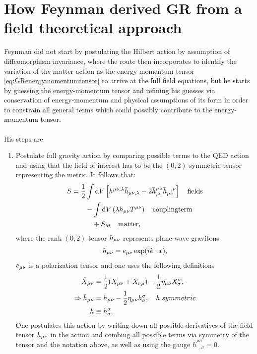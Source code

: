 \section{How Feynman derived GR from a field theoretical approach}
Feynman did not start by postulating the Hilbert action by assumption of diffeomorphism invariance, where the route then incorporates to identify the variation of the matter action as the energy momentum tensor \ref{eq:GRenergymomentumtensor} to arrive at the full field equations, but he starts by guessing the energy-momentum tensor and refining his guesses via conservation of energy-momentum and physical assumptions of its form in order to constrain all general terms which could possibly contribute to the energy-momentum tensor.\\
\\
His steps are
\begin{enumerate}
	\item Postulate full gravity action by comparing possible terms to the QED action and using that the field of interest has to be the $(0,2)$ symmetric tensor representing the metric. It follows that:
	\begin{align}
		S &= \frac{1}{2} \int \mathrm{d} V\left[h^{\mu \nu, \lambda} \bar{h}_{\mu \nu, \lambda} - 2 \bar{h}^{\mu \lambda}_{,\lambda} \bar{h}^{\;\;\,,\nu}_{\mu \nu} \right] \quad \mathrm{fields} \nonumber \\
		& \qquad - \int \mathrm{d} V \left(\lambda h_{\mu \nu} T^{\mu \nu}\right) \quad \mathrm{coupling term} \nonumber \\
		&\qquad \quad + S_M \quad \mathrm{matter},
	\end{align}
where the rank $(0,2)$ tensor $h_{\mu \nu}$ represents plane-wave gravitons 
\begin{equation}
	h_{\mu \nu} = e_{\mu \nu} \exp(i k \cdot x),
\end{equation}
$e_{\mu \nu}$ is a polarization tensor and one uses the following definitions
\begin{align*}
	\bar{X}_{\mu \nu} &= \frac{1}{2} (X_{\mu \nu} + X_{\nu \mu}) - \frac{1}{2} \eta_{\mu \nu} X^\sigma_\sigma,\\
	\Rightarrow \bar{h}_{\mu \nu} &= h_{\mu \nu} - \frac{1}{2} \eta_{\mu \nu} h^\sigma_\sigma, \quad h \; symmetric \\
	h&\equiv h^\sigma_\sigma.
\end{align*}
One postulates this action by writing down all possible derivatives of the field tensor $h_{\mu \nu}$ in the action and combing all possible terms via symmetry of the tensor and the notation above, as well as using the gauge $\bar{h}^{\mu \sigma}_{\;\; , \sigma}=0$.

\end{enumerate}
